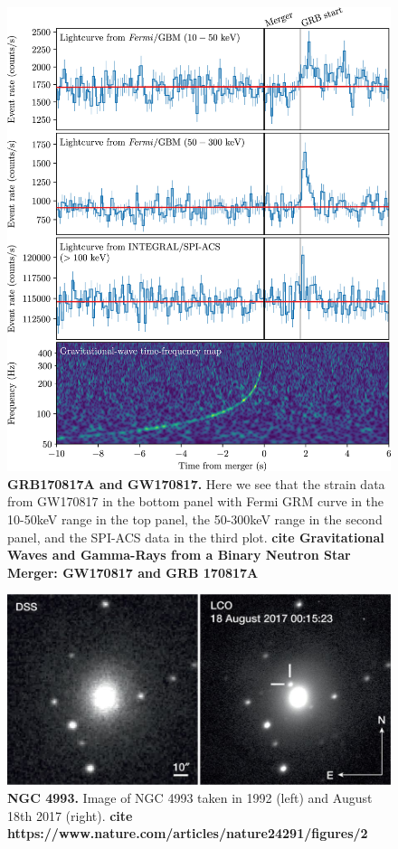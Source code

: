 \documentclass[11pt]{cuthesis}
\begin{document}
\begin{figure} %
\begin{center}
\includegraphics[width=0.8\linewidth]{grb-gw-170817.jpg}
\end{center}
\caption{\textbf{GRB170817A and GW170817.} Here we see that the strain data from GW170817 in the bottom panel with Fermi GRM curve in the 10-50keV range in the top panel, the 50-300keV range in the second panel, and the SPI-ACS data in the third plot. \textbf{cite Gravitational Waves and Gamma-Rays from a Binary Neutron Star Merger: GW170817 and GRB 170817A} }
\label{fig:grb gw 170817}
\end{figure}

\begin{figure} %
\begin{center}
\includegraphics[width=0.8\linewidth]{NGC4993.jpg}
\end{center}
\caption{\textbf{NGC 4993.} Image of NGC 4993 taken in 1992 (left) and August 18th 2017 (right). \textbf{cite https://www.nature.com/articles/nature24291/figures/2} }
\label{fig:NGC4993}
\end{figure}
\end{document}
